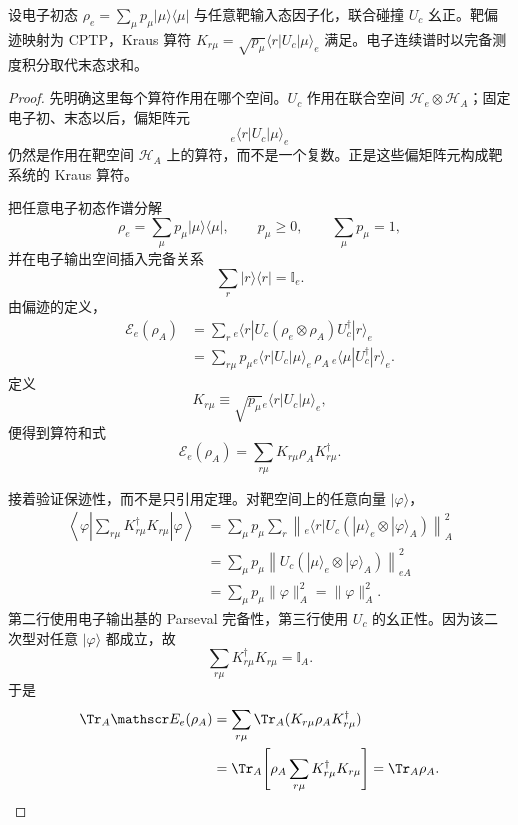 \begin{theorem}
设电子初态 $\rho_e=\sum_\mu p_\mu|\mu\rangle\langle\mu|$ 与任意靶输入态因子化，联合碰撞 $U_c$ 幺正。靶偏迹映射为 CPTP，Kraus 算符 $K_{r\mu}=\sqrt{p_\mu}\langle r|U_c|\mu\rangle_e$ 满足。电子连续谱时以完备测度积分取代末态求和。
\end{theorem}
\begin{proof}
先明确这里每个算符作用在哪个空间。$U_c$ 作用在联合空间 $\mathcal H_e\otimes\mathcal H_A$；固定电子初、末态以后，偏矩阵元
\[
{}_e\!\langle r|U_c|\mu\rangle_e
\]
仍然是作用在靶空间 $\mathcal H_A$ 上的算符，而不是一个复数。正是这些偏矩阵元构成靶系统的 Kraus 算符。

把任意电子初态作谱分解
\[
\rho_e=\sum_\mu p_\mu|\mu\rangle\langle\mu|,
\qquad p_\mu\ge0,
\qquad \sum_\mu p_\mu=1,
\]
并在电子输出空间插入完备关系
\[
\sum_r|r\rangle\langle r|=\mathbb I_e.
\]
由偏迹的定义，
\begin{align*}
\mathscr E_e(\rho_A)
&=\sum_r{}_e\!\langle r|
U_c(\rho_e\otimes\rho_A)U_c^\dagger
|r\rangle_e\\
&=\sum_{r\mu}p_\mu
{}_e\!\langle r|U_c|\mu\rangle_e\,
\rho_A\,
{}_e\!\langle\mu|U_c^\dagger|r\rangle_e.
\end{align*}
定义
\[
K_{r\mu}\equiv\sqrt{p_\mu}
{}_e\!\langle r|U_c|\mu\rangle_e,
\]
便得到算符和式
\[
\mathscr E_e(\rho_A)
=\sum_{r\mu}K_{r\mu}\rho_AK_{r\mu}^\dagger.
\]

接着验证保迹性，而不是只引用定理。对靶空间上的任意向量 $|\varphi\rangle$，
\begin{align*}
\left\langle\varphi\left|
\sum_{r\mu}K_{r\mu}^\dagger K_{r\mu}
\right|\varphi\right\rangle
&=\sum_\mu p_\mu\sum_r
\left\|
{}_e\!\langle r|U_c(|\mu\rangle_e\otimes|\varphi\rangle_A)
\right\|_A^2\\
&=\sum_\mu p_\mu
\left\|U_c(|\mu\rangle_e\otimes|\varphi\rangle_A)\right\|_{eA}^2\\
&=\sum_\mu p_\mu\|\varphi\|_A^2
=\|\varphi\|_A^2.
\end{align*}
第二行使用电子输出基的 Parseval 完备性，第三行使用 $U_c$ 的幺正性。因为该二次型对任意 $|\varphi\rangle$ 都成立，故
\[
\sum_{r\mu}K_{r\mu}^\dagger K_{r\mu}=\mathbb I_A.
\]
于是
\begin{align*}
\Tr_A\mathscr E_e(\rho_A)
&=\sum_{r\mu}\Tr_A(K_{r\mu}\rho_AK_{r\mu}^\dagger)\\
&=\Tr_A\!\left[
\rho_A\sum_{r\mu}K_{r\mu}^\dagger K_{r\mu}
\right]
=\Tr_A\rho_A.
\end{align*}


\end{proof}
